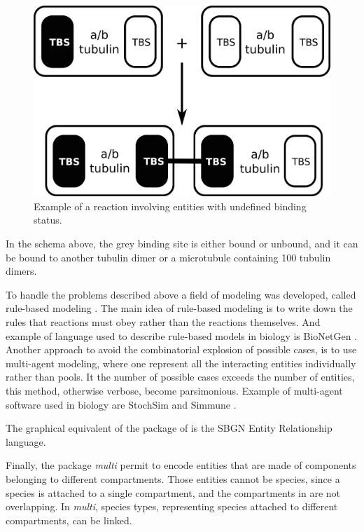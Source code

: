 \begin{figure}[H]
\begin{center}
\includegraphics{figs/pngs/microtubule.png}
\caption{Example of a reaction involving entities with undefined binding status.}
\label{fig:microtubule}
\end{center}
\end{figure}

In the schema above, the grey binding site is either bound or unbound, and it can be bound to another tubulin dimer or a microtubule containing 100 tubulin dimers.

To handle the problems described above a field of modeling was developed, called rule-based modeling \citep{Hlavacek:2006}. The main idea of rule-based modeling is to write down the rules that reactions must obey rather than the reactions themselves. And example of language used to describe rule-based models in biology is BioNetGen \citep{Blinov:2004}. Another approach to avoid the combinatorial explosion of possible cases, is to use multi-agent modeling, where one represent all the interacting entities individually rather than pools. It the number of possible cases exceeds the number of entities, this method, otherwise verbose, become parsimonious. Example of multi-agent software used in biology are StochSim \citep{MortonFirth:1998,Lenov:2001} and Simmune \citep{MeierSchellersheim:2001,MeierSchellersheim:2006}. 

The graphical equivalent of the package \multiVone of \sbmlLthreeVone is the SBGN Entity Relationship language.

Finally, the package \emph{multi} permit to encode entities that are made of components belonging to different compartments. Those entities cannot be species, since a species is attached to a single compartment, and the compartments in \sbmlLthreeVone are not overlapping. In \emph{multi}, species types, representing species attached to different compartments, can be linked.  

